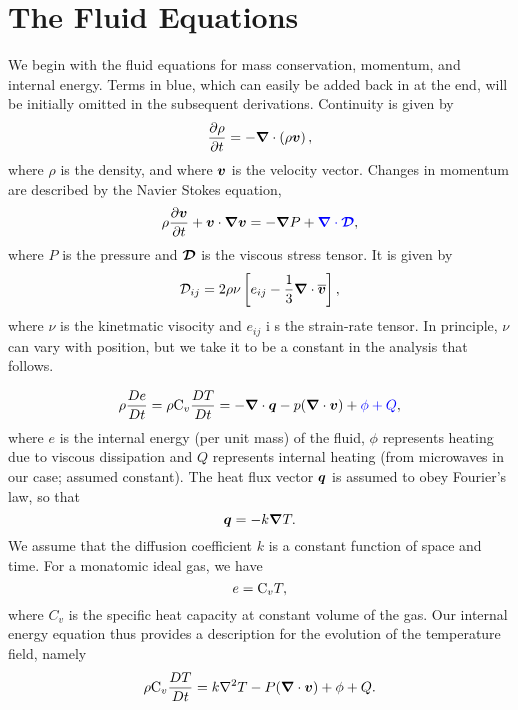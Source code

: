 
\section{The Fluid Equations}

We begin with the fluid equations for mass conservation, momentum, and internal energy.  Terms in blue, which can easily be added back in at the end, will be initially omitted in the subsequent derivations.    Continuity is given by
\begin{equation}
\label{eq:continuity}
\frac{\partial\rho}{\partial t} = -\boldsymbol{\nabla}\cdot\left(\rho\boldsymbol{v}\right),
\end{equation}
where $\rho$ is the density, and where $\boldsymbol{v}$ is the velocity vector.  Changes in momentum are described by the Navier Stokes equation,
\begin{equation}
\label{eq:momentum}
\rho\frac{\partial\boldsymbol{v}}{\partial t}+\boldsymbol{v}\cdot\boldsymbol{\nabla}\boldsymbol{v} = -\boldsymbol{\nabla} P + {\color{blue} \boldsymbol{\nabla}\cdot\boldsymbol{\mathcal{D}}},
\end{equation}
where $P$ is the pressure and $\boldsymbol{\mathcal{D}}$ is the viscous stress tensor.  It is given by
\begin{equation}
\mathcal{D}_{ij} = 2\rho\nu\left[e_{ij}-\frac{1}{3}\boldsymbol{\nabla}\cdot\overline{\boldsymbol{v}}\right],
\end{equation}
where $\nu$ is the kinetmatic visocity and $e_{ij}$ i s the strain-rate tensor.   In principle, $\nu$ can vary with position, but we take it to be a constant in the analysis that follows.

\begin{equation}
\rho \frac{De}{Dt} = \rho \mathrm{C}_v\frac{DT}{Dt} = -\boldsymbol{\nabla}\cdot\boldsymbol{q} - p(\boldsymbol{\nabla}\cdot\boldsymbol{v}) + {\color{blue} \phi + Q} ,
\end{equation}
where $e$ is the internal energy (per unit mass) of the fluid, $\phi$ represents heating due to viscous dissipation and $Q$ represents internal heating (from microwaves in our case; assumed constant).  The heat flux vector $\boldsymbol{q}$ is assumed to obey Fourier's law, so that
\begin{equation}
\boldsymbol{q} = -k\boldsymbol{\nabla} T.
\end{equation}
We assume that the diffusion coefficient $k$ is a constant function of space and time.  For a monatomic ideal gas, we have 
\begin{equation}
e = \mathrm{C}_v T,
\end{equation}
where $C_v$ is the specific heat capacity at constant volume of the gas.  Our internal energy equation thus provides a description for the evolution of the temperature field, namely
\begin{equation}
\label{eq:internal}
\rho \mathrm{C}_v\frac{DT}{Dt} = k\nabla^2 T - P(\boldsymbol{\nabla}\cdot\boldsymbol{v}) + \phi + Q. 
\end{equation}







